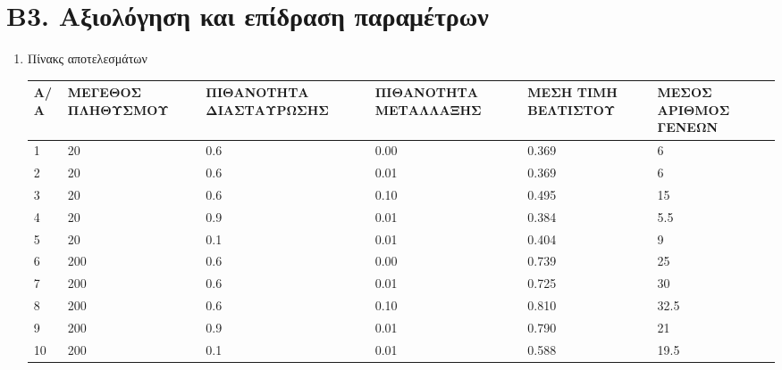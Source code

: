 \documentclass[12pt,a4paper]{article}
\begin{document}
            \section*{Β3. Αξιολόγηση και επίδραση παραμέτρων}
                \begin{enumerate}


                    \item Πίνακς αποτελεσμάτων \\
                     \begin{tabular}{|p{2em}| p{7em} | p{7em} | p{8em} | p{6.5em} | p{6em} | }
                        \hline
                        \textbf{Α/Α} & \textbf{ΜΕΓΕΘΟΣ ΠΛΗΘΥΣΜΟΥ} &
                        \textbf{ΠΙΘΑΝΟΤΗΤΑ
                            ΔΙΑΣΤΑΥΡΩΣΗΣ} & \textbf{ΠΙΘΑΝΟΤΗΤΑ
                        ΜΕΤΑΛΛΑΞΗΣ} & \textbf{ΜΕΣΗ ΤΙΜΗ ΒΕΛΤΙΣΤΟΥ} & \textbf{ΜΕΣΟΣ
                    ΑΡΙΘΜΟΣ ΓΕΝΕΩΝ}\\
                        \hline
                        1  & 20  & 0.6 & 0.00 & 0.369 & 6  \\
                        \hline
                        2  & 20  & 0.6 & 0.01 & 0.369 & 6  \\
                        \hline
                        3  & 20  & 0.6 & 0.10 & 0.495 & 15 \\
                        \hline
                        4  & 20  & 0.9 & 0.01 & 0.384 & 5.5 \\
                        \hline
                        5  & 20  & 0.1 & 0.01 & 0.404 & 9 \\
                        \hline
                        6  & 200 & 0.6 & 0.00 & 0.739 & 25 \\
                        \hline
                        7  & 200 & 0.6 & 0.01 & 0.725 & 30 \\
                        \hline
                        8  & 200 & 0.6 & 0.10 & 0.810 & 32.5 \\
                        \hline
                        9  & 200 & 0.9 & 0.01 & 0.790 & 21 \\
                        \hline
                        10 & 200 & 0.1 & 0.01 & 0.588 & 19.5 \\
                        \hline

                \end{tabular}


\end{enumerate}
\end{document}

